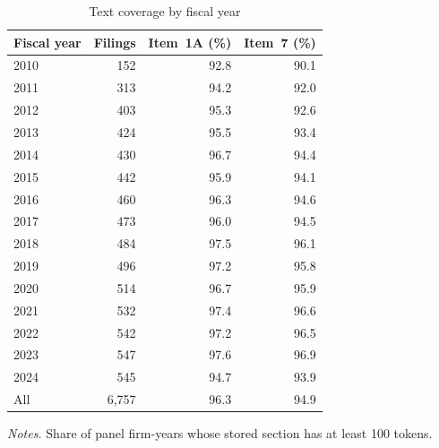 \begin{table}[htbp]
\centering
\caption{Text coverage by fiscal year}
\label{tab:text_coverage}
\small
\begin{tabular}{lrrr}
\toprule
Fiscal year & Filings & Item~1A (\%) & Item~7 (\%) \\
\midrule
2010 & 152 & 92.8 & 90.1 \\
2011 & 313 & 94.2 & 92.0 \\
2012 & 403 & 95.3 & 92.6 \\
2013 & 424 & 95.5 & 93.4 \\
2014 & 430 & 96.7 & 94.4 \\
2015 & 442 & 95.9 & 94.1 \\
2016 & 460 & 96.3 & 94.6 \\
2017 & 473 & 96.0 & 94.5 \\
2018 & 484 & 97.5 & 96.1 \\
2019 & 496 & 97.2 & 95.8 \\
2020 & 514 & 96.7 & 95.9 \\
2021 & 532 & 97.4 & 96.6 \\
2022 & 542 & 97.2 & 96.5 \\
2023 & 547 & 97.6 & 96.9 \\
2024 & 545 & 94.7 & 93.9 \\
\midrule
All & 6,757 & 96.3 & 94.9 \\
\bottomrule
\end{tabular}
\par\smallskip
\begin{minipage}{\linewidth}\footnotesize
\emph{Notes.} Share of panel firm-years whose stored section has at least 100 tokens.
\end{minipage}
\end{table}
